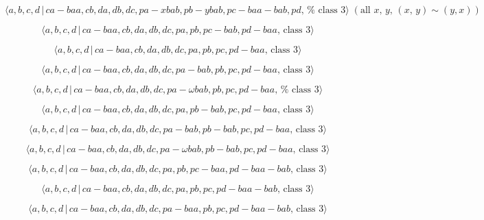 \documentclass[10pt]{article}
\begin{document}
\begin{equation}
\langle a,b,c,d\,|\,ca-baa,cb,da,db,dc,pa-xbab,pb-ybab,pc-baa-bab,pd,\,\text{%
class }3\rangle \;(\text{all }x,\,y,\,(x,\,y)\sim (y,x))  \tag{7.3367}
\end{equation}

\begin{equation}
\langle a,b,c,d\,|\,ca-baa,cb,da,db,dc,pa,pb,pc-bab,pd-baa,\,\text{class }%
3\rangle  \tag{7.3368}
\end{equation}

\begin{equation}
\langle a,b,c,d\,|\,ca-baa,cb,da,db,dc,pa,pb,pc,pd-baa,\,\text{class }%
3\rangle  \tag{7.3369}
\end{equation}

\begin{equation}
\langle a,b,c,d\,|\,ca-baa,cb,da,db,dc,pa-bab,pb,pc,pd-baa,\,\text{class }%
3\rangle  \tag{7.3370}
\end{equation}

\begin{equation}
\langle a,b,c,d\,|\,ca-baa,cb,da,db,dc,pa-\omega bab,pb,pc,pd-baa,\,\text{%
class }3\rangle  \tag{7.3371}
\end{equation}

\begin{equation}
\langle a,b,c,d\,|\,ca-baa,cb,da,db,dc,pa,pb-bab,pc,pd-baa,\,\text{class }%
3\rangle  \tag{7.3372}
\end{equation}

\begin{equation}
\langle a,b,c,d\,|\,ca-baa,cb,da,db,dc,pa-bab,pb-bab,pc,pd-baa,\,\text{class 
}3\rangle  \tag{7.3373}
\end{equation}

\begin{equation}
\langle a,b,c,d\,|\,ca-baa,cb,da,db,dc,pa-\omega bab,pb-bab,pc,pd-baa,\,%
\text{class }3\rangle  \tag{7.3374}
\end{equation}

\begin{equation}
\langle a,b,c,d\,|\,ca-baa,cb,da,db,dc,pa,pb,pc-baa,pd-baa-bab,\,\text{class 
}3\rangle  \tag{7.3375}
\end{equation}

\begin{equation}
\langle a,b,c,d\,|\,ca-baa,cb,da,db,dc,pa,pb,pc,pd-baa-bab,\,\text{class }%
3\rangle  \tag{7.3376}
\end{equation}

\begin{equation}
\langle a,b,c,d\,|\,ca-baa,cb,da,db,dc,pa-baa,pb,pc,pd-baa-bab,\,\text{class 
}3\rangle  \tag{7.3377}
\end{equation}
\end{document}

